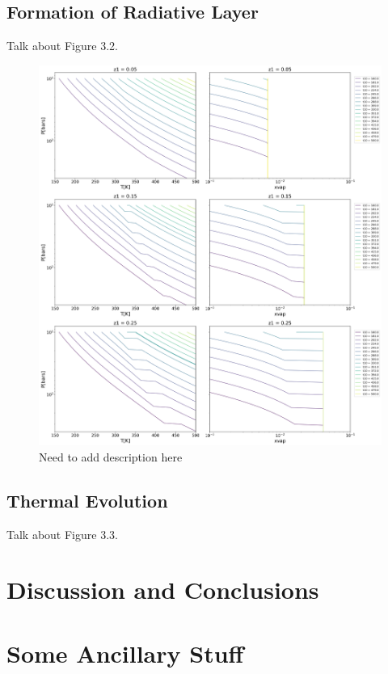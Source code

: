 \documentclass[11pt]{ucscthesisbs}
\begin{document}
\section{Formation of Radiative Layer}
Talk about Figure 3.2.
\begin{figure}[ht!]
 \centerline{
  \includegraphics[width=7.0in]{figures/static_radiative_layer_plots_without_grid_points.png}
 }
\caption[Inhibition of convection on Neptune]
{Need to add description here }
\label{fig:neptune}
\end{figure}


\section{Thermal Evolution}
Talk about Figure 3.3.



\chapter{Discussion and Conclusions}





\appendix
\chapter{Some Ancillary Stuff}



\end{document}
